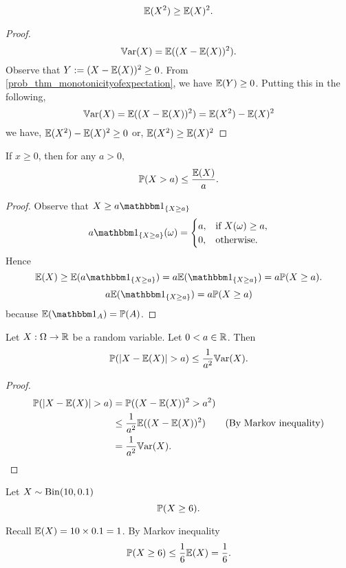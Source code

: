 \documentclass[10pt, a4paper]{article}
\begin{document}
\begin{corollary}
    \[
    \E(X ^ 2) \geq \E(X) ^ 2.
    \]
    \begin{proof}
        \[
        \Var(X) = \E((X - \E(X)) ^ 2).
        \]
        Observe that $Y := (X - \E(X)) ^ 2 \geq 0$.
        From \autoref{prob_thm_monotonicityofexpectation},
        we have $\E(Y) \geq 0$.
        Putting this in the following,
        \[
        \Var(X) = \E((X - \E(X)) ^ 2) = \E(X ^ 2) - \E(X) ^ 2
        \]
        we have,
        $\E(X ^ 2) - \E(X) ^ 2 \geq 0$ or,
        $\E(X ^ 2) \geq \E(X) ^ 2$
    \end{proof}
\end{corollary}

\begin{corollary}
    If $x \geq 0$,
    then for any $a > 0$,
    \[
    \P(X > a) \leq \frac{\E(X)}{a}.
    \]
    \begin{proof}
        Observe that $X \geq a\ind[\{X \geq a\}]$
        \[
        a\ind[\{X \geq a\}](\omega) = \begin{cases}
            a, & \text{if } X(\omega) \geq a, \\
            0, & \text{otherwise}.
        \end{cases}
        \]
        Hence
        \[
        \E(X) \geq \E(a\ind[\{X \geq a\}]) = a\E(\ind[\{X \geq a\}]) = a\P(X \geq a).
        \]
        \[
        a\E(\ind[\{X \geq a\}]) = a\P(X \geq a)
        \]
        because $\E(\ind) = \P(A)$.
    \end{proof}
\end{corollary}

\begin{corollary}
    Let $X : \Omega \rightarrow \R$ be a random variable.
    Let $0 < a \in \R$.
    Then
    \[
    \P(|X - \E(X)| > a) \leq \frac{1}{a ^ 2}\Var(X).
    \]
    \begin{proof}
        \begin{align*}
            \P(|X - \E(X)| > a) &= \P((X - \E(X)) ^ 2 > a ^ 2) \\
            &\leq \frac{1}{a ^ 2}\E((X - \E(X)) ^ 2) & \text{(By Markov inequality)} \\
            &= \frac{1}{a ^ 2}\Var(X).
        \end{align*}
    \end{proof}
\end{corollary}

\begin{example}
    Let $X \sim \Bin(10, 0.1)$
    \[
    \P(X \geq 6).
    \]

    Recall $\E(X) = 10 \times 0.1 = 1$.
    By Markov inequality
    \[
    \P(X \geq 6) \leq \frac{1}{6}\E(X) = \frac{1}{6}.
    \]
\end{example}
\end{document}
